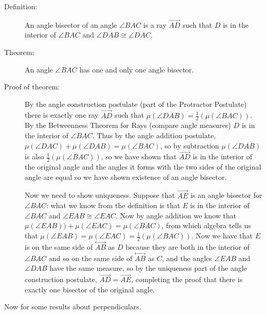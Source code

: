 \documentclass[12pt]{article}
\newcommand\Line[1]{\overset{\leftrightarrow}{#1}}
\begin{document}
\begin{description}

\item[Definition:]  An angle bisector of an angle $\angle BAC$ is a ray $\overrightarrow{AD}$ such that $D$ is in the interior of $\angle BAC$ and $\angle DAB \cong \angle DAC$.

\item[Theorem:]  An angle $\angle BAC$ has one and only one angle bisector.

\item[Proof of theorem:]  By the angle construction postulate (part of the Protractor Postulate) there is exactly one ray $\overrightarrow{AD}$ such that $\mu(\angle DAB) = \frac12(\mu(\angle BAC))$.  By the Betweenness Theorem for Rays (compare angle measures) $D$ is in the interior of $\angle BAC$.  Thus by the angle addition
postulate, $\mu(\angle DAC) + \mu(\angle DAB) = \mu(\angle BAC)$, so by subtraction $\mu(\angle DAB)$ is also $\frac 12(\mu(\angle BAC))$, so we have shown that
$\overrightarrow{AD}$ is in the interior of the original angle and the angles it forms with the two sides of the original angle are equal so we have shown existence of an angle bisector.

Now we need to show uniqueness.  Suppose that $\overrightarrow{AE}$ is an angle bisector for $\angle BAC$:  what we know from the definition is that $E$ is in the interior
of $\angle BAC$ and $\angle{EAB} \cong \angle{EAC}$.  Now by angle addition we know that $\mu(\angle EAB)) + \mu(\angle EAC) = \mu(\angle BAC)$, from which algebra
tells us that $\mu(\angle EAB) = \mu(\angle EAC) = \frac 12(\mu(\angle BAC))$.  Now we have that $E$ is on the same side of $\Line{AB}$ as $D$ because they are both in the interior of $\angle BAC$ and so on the same side of $\Line{AB}$ as $C$,  and the angles $\angle EAB$ and $\angle DAB$ have the same measure, so by the uniqueness part of the angle construction postulate, $\overrightarrow{AD} = \overrightarrow{AE}$, completing the proof that there is exactly one bisector of the original angle.

\end{description}

Now for some results about perpendiculars.
\end{document}
